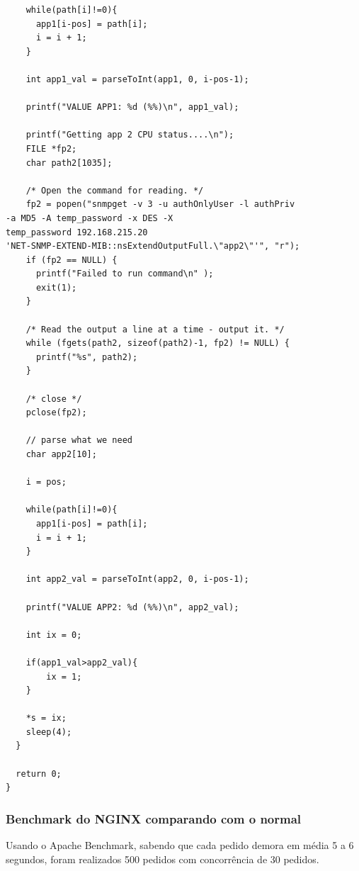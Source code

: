 \documentclass[pdftex,12pt,a4paper]{report}
\begin{document}
\begin{lstlisting}
    while(path[i]!=0){
      app1[i-pos] = path[i];
      i = i + 1;
    }

    int app1_val = parseToInt(app1, 0, i-pos-1);

    printf("VALUE APP1: %d (%%)\n", app1_val);

    printf("Getting app 2 CPU status....\n");
    FILE *fp2;
    char path2[1035];

    /* Open the command for reading. */
    fp2 = popen("snmpget -v 3 -u authOnlyUser -l authPriv
-a MD5 -A temp_password -x DES -X 
temp_password 192.168.215.20 
'NET-SNMP-EXTEND-MIB::nsExtendOutputFull.\"app2\"'", "r");
    if (fp2 == NULL) {
      printf("Failed to run command\n" );
      exit(1);
    }

    /* Read the output a line at a time - output it. */
    while (fgets(path2, sizeof(path2)-1, fp2) != NULL) {
      printf("%s", path2);
    }

    /* close */
    pclose(fp2);

    // parse what we need
    char app2[10];

    i = pos;

    while(path[i]!=0){
      app1[i-pos] = path[i];
      i = i + 1;
    }

    int app2_val = parseToInt(app2, 0, i-pos-1);

    printf("VALUE APP2: %d (%%)\n", app2_val);

    int ix = 0;

    if(app1_val>app2_val){
        ix = 1;
    }

    *s = ix;
    sleep(4);
  }

  return 0;
}
\end{lstlisting}

\newpage
\subsubsection{Benchmark do NGINX comparando com o normal}

Usando o Apache Benchmark, sabendo que cada pedido demora em média 5 a 6 segundos, foram realizados 500 pedidos com concorrência de 30 pedidos.
\end{document}
